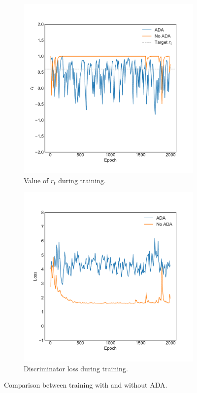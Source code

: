 \begin{figure}[h]
    \centering
    \begin{subfigure}{0.45\textwidth}
        \centering
        \includegraphics[width=\linewidth]{labels/figs/ada_r_t.pdf}
        \caption{Value of $r_t$ during training.}
        \label{fig:acgan_ada_r_t}
    \end{subfigure} %
    \begin{subfigure}{0.45\textwidth}
        \centering
        \includegraphics[width=\linewidth]{labels/figs/ada_dis.pdf}
        \caption{Discriminator loss during training.}
        \label{fig:acgan_ada_dis}
    \end{subfigure}
    \caption{Comparison between training with and without ADA.}
    \label{fig:acgan_ada}
\end{figure}

